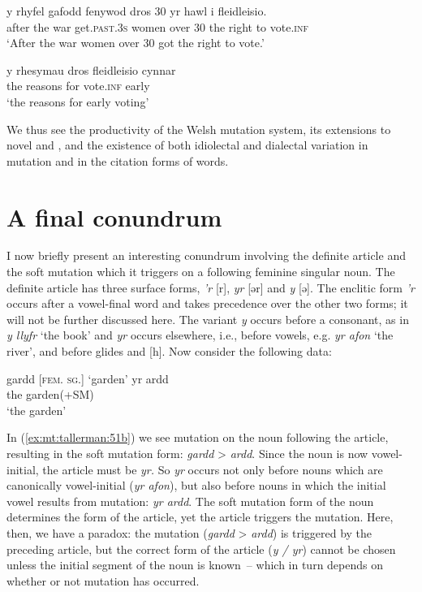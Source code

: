 \documentclass[output=paper,colorlinks,citecolor=brown]{langscibook}
\begin{document}
\ea\label{ex:mt:tallerman:49}
 y rhyfel gafodd fenywod dros 30 yr hawl i fleidleisio.\\
after the war get.\textsc{past.3s} women over 30 the right to vote.\textsc{inf}\\
\glt ‘After the war women over 30 got the right to vote.’
\z

\ea
\gll y rhesymau dros fleidleisio cynnar\\
the reasons for vote.\textsc{inf} early \\
\glt ‘the reasons for early voting’
\z

We thus see the productivity of the Welsh mutation system, its extensions to novel and , and the existence of both idiolectal and dialectal variation in mutation and in the citation forms of words.


\section{A final conundrum}\label{sec:tallerman:5}

I now briefly present an interesting conundrum involving the definite article and the soft mutation which it triggers on a following feminine singular noun. The definite article has three surface forms, {\textit{’r}} [r], \textit{yr} [ər] and \textit{y}{ [ə]. The enclitic form} {\textit{’r}}{ occurs after a vowel-final word and takes precedence over the other two forms; it will not be further discussed here. The variant} {\textit{y} }{occurs before a consonant, as in} {\textit{y llyfr}}{ ‘the book’ and} {\textit{yr}}{ occurs elsewhere, i.e., before vowels, e.g.} {\textit{yr afon} }{‘the river’, and before glides and [h]. Now consider the following data:}

\ea
\ea\label{ex:mt:tallerman:51a}
gardd \textsc{[fem.} \textsc{sg.]}
\glt ‘garden’
\ex \label{ex:mt:tallerman:51b}
\gll yr ardd \\
the garden(+SM) \\ \jambox{[g] > ${\emptyset}$}
\glt ‘the garden’
\z
\z

{In (\ref{ex:mt:tallerman:51b}) we see mutation on the noun following the article, resulting in the soft mutation form:} {\textit{gardd} }{>} {\textit{ardd}}{. Since the noun is now vowel-initial, the article must be} {\textit{yr.} }{So} {\textit{yr} }{occurs not only before nouns which are canonically vowel-initial (}{\textit{yr afon}}{), but also before nouns in which the initial vowel results from mutation:} {\textit{yr ardd}}{. The soft mutation form of the noun determines the form of the article, yet the article triggers the mutation. Here, then, we have a paradox: the mutation (}{\textit{gardd} }{>} {\textit{ardd}}{) is triggered by the preceding article, but the correct form of the article (}{\textit{y / yr}}{) cannot be chosen unless the initial segment of the noun is known~– which in turn depends on whether or not mutation has occurred.}
\end{document}
